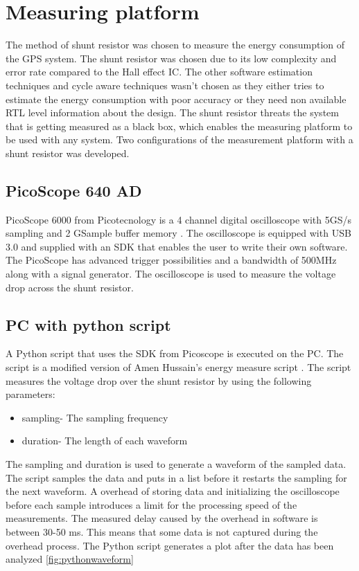 \chapter{Measuring platform}

The method of shunt resistor was chosen to measure the energy consumption of the GPS system. The shunt resistor was chosen due to its low complexity and error rate compared to the Hall effect IC. The other software estimation techniques and cycle aware techniques wasn't chosen as they either tries to estimate the energy consumption with poor accuracy or they need non available RTL level information about the design. The shunt resistor threats the system that is getting measured as a black box, which enables the measuring platform to be used with any system. Two configurations of the measurement platform with a shunt resistor was developed.


\section{PicoScope 640 AD}
PicoScope 6000 from Picotecnology is a 4 channel digital oscilloscope with 5GS/s sampling and 2 GSample buffer memory \cite{Pico}. The oscilloscope is equipped with USB 3.0 and supplied with an SDK that enables the user to write their own software. The PicoScope has advanced trigger possibilities and a bandwidth of 500MHz along with a signal generator. The oscilloscope is used to measure the voltage drop across the shunt resistor.   

\section{PC with python script}
A Python script that uses the SDK from Picoscope is executed on the PC. The script is a modified version of Amen Hussain's energy measure script \cite{Amen}. The script measures the voltage drop over the shunt resistor by using the following parameters:

\begin{itemize}
    \item sampling- The sampling frequency 
    \item duration- The length of each waveform
    
\end{itemize}

The sampling and duration is used to generate a waveform of the sampled data. The script samples the data and puts in a list before it restarts the sampling for the next waveform. A overhead of storing data and initializing the oscilloscope before each sample introduces a limit for the processing speed of the measurements. The measured delay caused by the overhead in software is between 30-50 ms. This means that some data is not captured during the overhead process.
The Python script generates a plot after the data has been analyzed \ref{fig:pythonwaveform}

